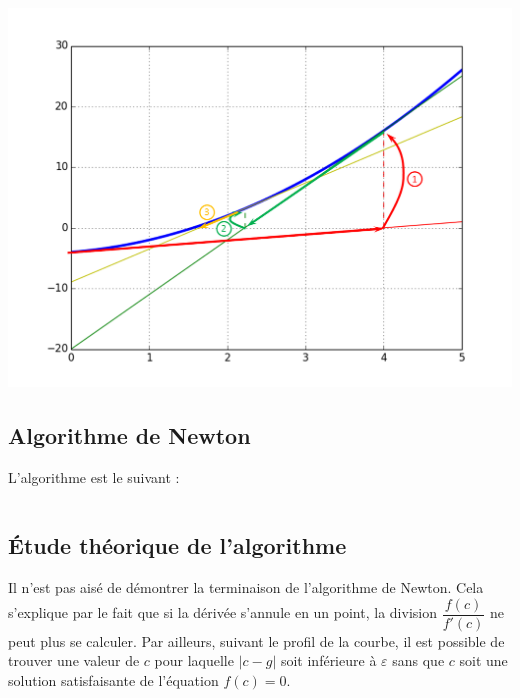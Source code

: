 \documentclass[10pt]{article}
\newif\ifprof
\begin{document}
\begin{center}
\includegraphics[width=.7\textwidth]{images/interpretation_newton}
\end{center}
 
\subsection{Algorithme de Newton}

L'algorithme est le suivant :

\ifprof
\begin{pseudo}
\begin{algorithm}[H]
\Fonction{
Données:$f$, $f'$, $a$, $\varepsilon$ \\
$g\gets a$\\
$c \gets  g-\dfrac{f(g)}{f'(g)} $\\
\Tq{$ |c-g|> \varepsilon$}{
$g \gets  c$ \\
$c \gets c-\dfrac{f(c)}{f'(c)}$
}
\Retour{$c$}
}
\end{algorithm}
\end{pseudo}
\else 
\newpage
\begin{pseudo}
$$ \quad $$
\vspace{6cm}
$$ \quad $$
\end{pseudo}
\fi

\subsection{Étude théorique de l'algorithme}

Il n'est pas aisé de démontrer la terminaison de l'algorithme de Newton. Cela s'explique par le fait que si la dérivée s'annule en un point, la division $\dfrac{f(c)}{f'(c)}$ ne peut plus se calculer. Par ailleurs, suivant le profil de la courbe, il est possible de trouver une valeur de $c$ pour laquelle $|c-g|$ soit inférieure à $\varepsilon$ sans que $c$ soit une solution satisfaisante de l'équation $f(c)=0$. 
\end{document}
